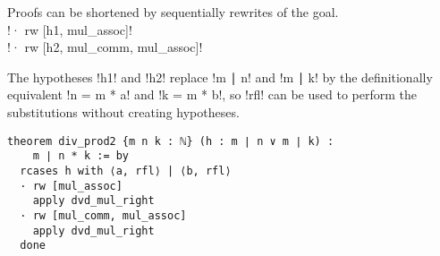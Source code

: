 Proofs can be shortened by sequentially rewrites of the goal.\\
\indnt{}!· rw [h1, mul_assoc]!\\
\indnt{}!· rw [h2, mul_comm, mul_assoc]!

The hypotheses !h1! and !h2! replace !m ∣ n! and !m ∣ k! by the definitionally equivalent !n = m * a! and !k = m * b!, so !rfl! can be used to perform the substitutions without creating hypotheses.
\begin{Verbatim}
theorem div_prod2 {m n k : ℕ} (h : m ∣ n ∨ m ∣ k) :
    m ∣ n * k := by
  rcases h with ⟨a, rfl⟩ | ⟨b, rfl⟩
  · rw [mul_assoc]
    apply dvd_mul_right
  · rw [mul_comm, mul_assoc]
    apply dvd_mul_right
  done
\end{Verbatim}
